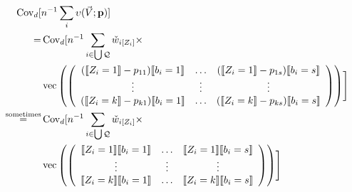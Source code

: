 \documentclass{article}
\DeclarePairedDelimiter{\indicator}{\llbracket}{\rrbracket}
\newcommand{\owt}[1][{[z_{i}]}]{\ensuremath{\check{w}_{i#1}}}
\newcommand{\absorbInterceptsEF}{\upsilon}
\begin{document}
\begin{align}
\operatorname{Cov}_{d}[
  &n^{-1}\sum_{i}\absorbInterceptsEF(\vec{V}; \mathbf{p})] \nonumber\\
  =&\operatorname{Cov}_{d}[n^{-1}
                                                 \sum_{i \in \bigcup
     \mathcal{Q}} \owt[{[Z_{i}]}] \times \nonumber \\
&  \operatorname{vec}\left(%
                                                 \left(
                                                 \begin{array}{ccc}
                                                   (\indicator{Z_{i}=1}-p_{11})\indicator{b_{i}=1}&\ldots&(\indicator{Z_{i}=1}-p_{1s})\indicator{b_{i}=s}\\
                                                   \vdots & \vdots &
                                                                     \vdots
                                                   \\
                                                   (\indicator{Z_{i}=k}-p_{k1})\indicator{b_{i}=1}&\ldots&(\indicator{Z_{i}=k}-p_{ks})\indicator{b_{i}=s}\\
                                                 \end{array}
  \right)%
  \right)
  \Biggr] \nonumber \\
  \stackrel{\text{sometimes}}{=}&\operatorname{Cov}_{d}[n^{-1}
                                                 \sum_{i \in \bigcup
     \mathcal{Q}} \owt[{[Z_{i}]}] \times \nonumber \\
  &\operatorname{vec}\left(%
                                                 \left(
                                                 \begin{array}{ccc}
                                                   \indicator{Z_{i}=1}\indicator{b_{i}=1}&\ldots&\indicator{Z_{i}=1}\indicator{b_{i}=s}\\
                                                   \vdots & \vdots &
                                                                     \vdots
                                                   \\
                                                   \indicator{Z_{i}=k}\indicator{b_{i}=1}&\ldots&\indicator{Z_{i}=k}\indicator{b_{i}=s}\\
                                                 \end{array}
  \right)%
  \right)
    \Biggr] \label{eq:11}
\end{align}
\end{document}

